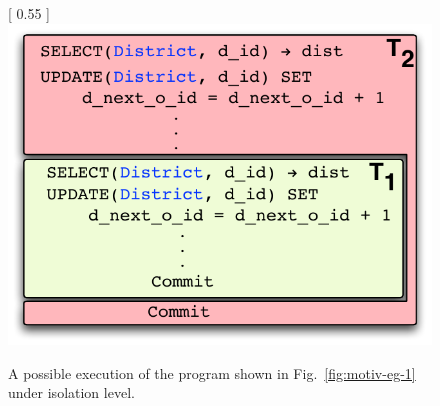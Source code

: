 \begin{figure}[!h]
\centering
{} [
  0.55\columnwidth
] {
  \includegraphics[scale=0.6]{Figures/motiv-eg-1-a}
}
\caption{\small A possible execution of the program shown in Fig.~\ref{fig:motiv-eg-1} under
   isolation level.}
\label{fig:rc-ex}
\end{figure}

